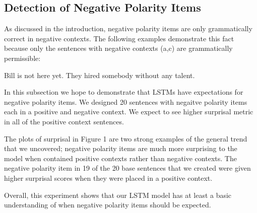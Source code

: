 \documentclass[11pt]{article}
\begin{document}
\subsection{Detection of Negative Polarity Items}
As discussed in the introduction, negative polarity items are only grammatically correct in negative contexts. The following examples demonstrate this fact because only the sentences with negative contexts (a,c) are grammatically permissible:
\begin{exe}
\ex
\begin{xlist}
\ex Bill is not here yet.
\ex They hired somebody without any talent.
\end{xlist}
\end{exe}
In this subsection we hope to demonstrate that LSTMs have expectations for negative polarity items. We designed 20 sentences with negaitve polarity items each in a positive and negative context. We expect to see higher surprisal metric in all of the positive context sentences.

The plots of surprisal in Figure 1 are two strong examples of the general trend that we uncovered; negative polarity items are much more surprising to the model when contained positive contexts rather than negative contexts. The negative polarity item in 19 of the 20 base sentences that we created were given higher surprisal scores when they were placed in a positive context.

Overall, this experiment shows that our LSTM model has at least a basic understanding of when negative polarity items should be expected.
\end{document}
